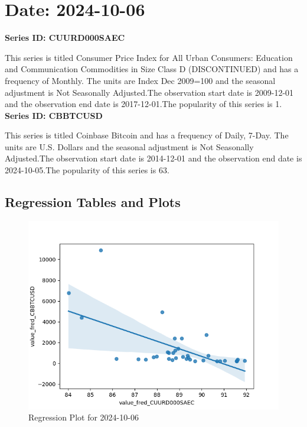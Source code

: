 \section{Date: 2024-10-06}
\noindent \textbf{Series ID: CUURD000SAEC} 

\noindent This series is titled Consumer Price Index for All Urban Consumers: Education and Communication Commodities in Size Class D (DISCONTINUED) and has a frequency of Monthly. The units are Index Dec 2009=100 and the seasonal adjustment is Not Seasonally Adjusted.The observation start date is 2009-12-01 and the observation end date is 2017-12-01.The popularity of this series is 1. \\ 

\noindent \textbf{Series ID: CBBTCUSD} 

\noindent This series is titled Coinbase Bitcoin and has a frequency of Daily, 7-Day. The units are U.S. Dollars and the seasonal adjustment is Not Seasonally Adjusted.The observation start date is 2014-12-01 and the observation end date is 2024-10-05.The popularity of this series is 63. \\ 

\subsection{Regression Tables and Plots}


\begin{figure}
\centering
\includegraphics[scale = 0.9]{plots/plot_2024-10-06.png}
\caption{Regression Plot for 2024-10-06}
\end{figure}
\newpage
